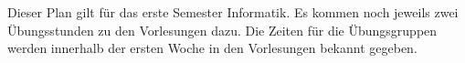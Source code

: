 Dieser Plan gilt für das erste Semester Informatik. Es kommen noch jeweils zwei Übungsstunden zu den Vorlesungen dazu.
Die Zeiten für die Übungsgruppen werden innerhalb der ersten Woche in den Vorlesungen bekannt gegeben.\\
